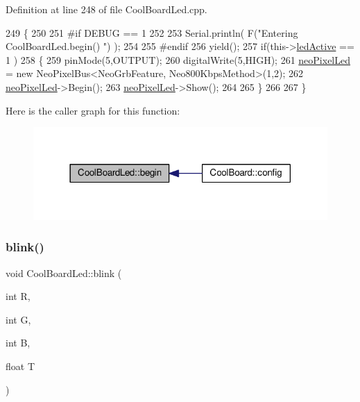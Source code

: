 Definition at line 248 of file Cool\+Board\+Led.\+cpp.


\begin{DoxyCode}
249 \{
250 
251 \textcolor{preprocessor}{#if DEBUG == 1}
252 
253     Serial.println( F(\textcolor{stringliteral}{"Entering CoolBoardLed.begin() "}) );
254 
255 \textcolor{preprocessor}{#endif}
256     yield();
257     \textcolor{keywordflow}{if}(this->\hyperlink{class_cool_board_led_aadd04d2ecf123247718d77f42fba7f08}{ledActive} == 1 )
258     \{
259         pinMode(5,OUTPUT);
260         digitalWrite(5,HIGH);
261         \hyperlink{class_cool_board_led_ac2c13fa462a010cd9242bf297c013923}{neoPixelLed} = \textcolor{keyword}{new} NeoPixelBus<NeoGrbFeature, Neo800KbpsMethod>(1,2); 
262         \hyperlink{class_cool_board_led_ac2c13fa462a010cd9242bf297c013923}{neoPixelLed}->Begin();
263         \hyperlink{class_cool_board_led_ac2c13fa462a010cd9242bf297c013923}{neoPixelLed}->Show();
264 
265     \}
266 
267 \} 
\end{DoxyCode}
Here is the caller graph for this function\+:\nopagebreak
\begin{figure}[H]
\begin{center}
\leavevmode
\includegraphics[width=318pt]{de/dc0/class_cool_board_led_ae3cbde8affcc6f011cbd698c8ef911f6_icgraph}
\end{center}
\end{figure}
\mbox{\label{class_cool_board_led_a96e1ea13003eee34c9dbcef340404426}} 
\subsubsection{\texorpdfstring{blink()}{blink()}}
{\footnotesize\ttfamily void Cool\+Board\+Led\+::blink (\begin{DoxyParamCaption}\item[{int}]{R,  }\item[{int}]{G,  }\item[{int}]{B,  }\item[{float}]{T }\end{DoxyParamCaption})}

